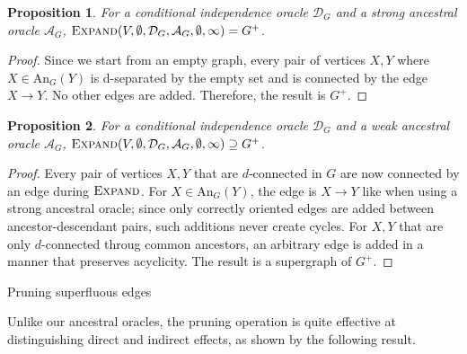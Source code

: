 \documentclass[accepted]{uai2025} %
\newtheorem{proposition}{Proposition}
\begin{document}
\begin{proposition}
For a conditional independence oracle
 $\mathcal{D}_G$ and a strong ancestral oracle $\mathcal{A}_G$, 
$\textsc{Expand}(V,\emptyset,\mathcal{D}_G,\mathcal{A}_G, \emptyset, \infty)=G^+$.
\label{prop:strongexpand}
\end{proposition}

\begin{proof}
Since we start from an empty graph, every pair of vertices $X, Y$ where
 $X \in \textrm{An}_G(Y)$ is d-separated by the empty set and is
 connected by the edge $X \to Y$. No other edges are added. Therefore, 
the result is $G^+$. 
\end{proof}

\begin{proposition}
For a conditional independence oracle
 $\mathcal{D}_G$ and a weak ancestral oracle $\mathcal{A}_G$, 
$\textsc{Expand}(V,\emptyset,\mathcal{D}_G,\mathcal{A}_G, \emptyset, \infty)
\supseteq G^+$.
\label{prop:weakexpand}
\end{proposition}

\begin{proof}
Every pair of vertices $X, Y$ that are $d$-connected 
in $G$ are now connected by an edge 
during $\textsc{Expand}$. For $X \in \textrm{An}_G(Y)$, the edge is 
$X \to Y$ like when using a strong ancestral oracle; 
since only correctly oriented
edges are added between ancestor-descendant pairs, 
such additions never create cycles.
For $X, Y$ that are only $d$-connected throug common ancestors, 
an arbitrary edge is added in a manner that preserves acyclicity.
The result is a supergraph of $G^+$.
\end{proof}


\begin{algorithm}[h]
\DontPrintSemicolon
\SetAlgoLined

\caption{Pruning superfluous edges}
\label{algo:prune}
\end{algorithm}

Unlike our ancestral oracles, the pruning operation is 
quite effective at distinguishing
direct and indirect effects, as shown by the following result.
\end{document}
